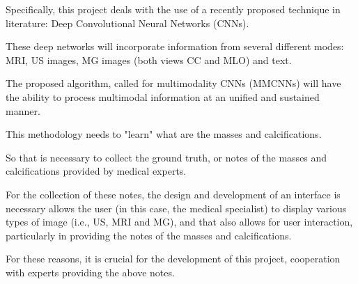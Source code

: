 Specifically, this project deals with the use of a recently proposed technique in literature: Deep Convolutional Neural Networks (CNNs).

These deep networks will incorporate information from several different modes: \gls{MRI}, \gls{US} images, \gls{MG} images (both views CC and MLO) and text.

The proposed algorithm, called for multimodality CNNs (MMCNNs) will have the ability to process multimodal information at an unified and sustained manner.

This methodology needs to "learn" what are the masses and calcifications.

So that is necessary to collect the ground truth, or notes of the masses and calcifications provided by medical experts.

\break

For the collection of these notes, the design and development of an interface is necessary allows the user (in this case, the medical specialist) to display various types of image (i.e., \gls{US}, \gls{MRI} and \gls{MG}), and that also allows for user interaction, particularly in providing the notes of the masses and calcifications.

For these reasons, it is crucial for the development of this project, cooperation with experts providing the above notes.